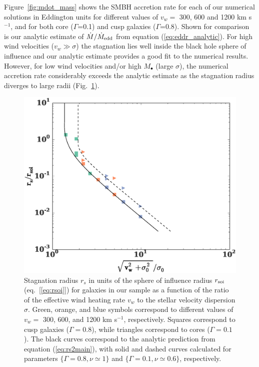 \documentclass[usenatbib,fleqn]{mn2e}
\newcommand{\vwO}{v_{w}}
\newcommand{\densSlope}{\nu}
\begin{document}
 Figure~\ref{fig:mdot_mass} shows the SMBH accretion rate for each of our numerical solutions in Eddington units for different values of $\vwO =$ 300, 600 and 1200 km s$^{-1}$, and for both core ($\Gamma$=0.1) and cusp galaxies ($\Gamma$=0.8).  Shown for comparison is our analytic estimate of $\dot{M}/\dot{M}_{\rm edd}$ from equation (\ref{eq:eddr_analytic}).  For high wind velocities ($v_{w} \gg \sigma$) the stagnation lies well inside the black hole sphere of influence and our analytic estimate provides a good fit to the numerical results.  However, for low wind velocities and/or high $M_{\bullet}$ (large $\sigma$), the numerical accretion rate considerably exceeds the analytic estimate as the stagnation radius diverges to large radii (Fig.~\ref{fig:stag}).  

\begin{figure}
  \includegraphics[width=\columnwidth]{rs.eps}
  \caption{\label{fig:stag} Stagnation radius
    $r_{s}$ in units of the sphere of influence radius $r_{\rm soi}$
    (eq.~[\ref{eq:rsoi}]) for galaxies in our sample as a function of
    the ratio of the effective wind heating rate $v_{w}$ to the
    stellar velocity dispersion $\sigma$.  Green, orange, and blue
    symbols correspond to different values of $v_{w} =$ 300, 600, and
    1200 km s$^{-1}$, respectively.  Squares correspond to cusp
    galaxies ($\Gamma = 0.8$), while triangles correspond to cores
    ($\Gamma = 0.1$). The black curves correspond to the analytic
    prediction from equation (\ref{eq:rs2main}), with solid and dashed
    curves calculated for parameters $\{\Gamma=0.8, \densSlope\simeq1\}$ and
    $\{\Gamma=0.1,\densSlope\simeq0.6\}$, respectively. }
\end{figure}
\end{document}
